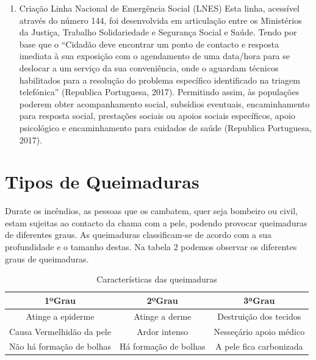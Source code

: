 \documentclass[a4paper,11pt]{report}
\begin{document}
\begin{enumerate}
\begin{itemize}
 \end{itemize}
 
  \item Criação Linha Nacional de Emergência Social (LNES)
  Esta linha, acessível através do número 144, foi desenvolvida em articulação entre os Ministérios da Justiça, Trabalho Solidariedade e Segurança Social e Saúde. Tendo por base que o “Cidadão deve encontrar um ponto de contacto e resposta imediata à sua exposição com o agendamento de uma data/hora para se deslocar a um serviço da sua conveniência, onde o aguardam técnicos habilitados para a resolução do problema específico identificado na triagem telefónica” (Republica Portuguesa, 2017). Permitindo assim, às populações poderem obter acompanhamento social, subsídios eventuais, encaminhamento para resposta social, prestações sociais ou apoios sociais específicos, apoio psicológico e encaminhamento para cuidados de saúde (Republica Portuguesa, 2017).


 \end{enumerate}

 
\part{Tipos de Queimaduras} 
Durate os incêndios, as pessoas que os cambatem, quer seja bombeiro ou civil,  estam sujeitas ao contacto da chama com a pele, podendo provocar queimaduras de diferentes graus.
As queimaduras classificam-se de acordo com a sua profundidade e o tamanho destas.
Na tabela 2 podemos observar os diferentes graus de queimaduras.

\begin{table}
\begin{tabular}{|c||c||c|}
\hline  
   \textbf{1ºGrau}	  	&  \textbf{2ºGrau}	  &  \textbf{3ªGrau}		 \\  \hline
   Atinge a epiderme		&  Atinge a derme         &  Destruição dos tecidos \\  \hline
   Causa Vermelhidão da pele   	&  Ardor intenso	  &  Nesseçário apoio médico \\  \hline
   Não há formação de bolhas    &  Há formação de bolhas  &  A pele fica carbonizada \\  \hline
\end{tabular}
\caption{Características das queimaduras}
\end{table}
 
\end{document}
